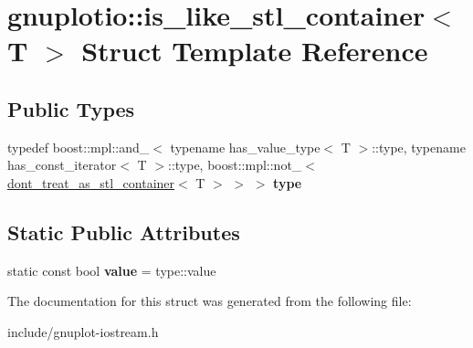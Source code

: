\hypertarget{structgnuplotio_1_1is__like__stl__container}{}\section{gnuplotio\+:\+:is\+\_\+like\+\_\+stl\+\_\+container$<$ T $>$ Struct Template Reference}
\label{structgnuplotio_1_1is__like__stl__container}
\subsection*{Public Types}
\begin{DoxyCompactItemize}
\item 
\mbox{\label{structgnuplotio_1_1is__like__stl__container_a050ecfa55e896a27f86d901334f47c6a}} 
typedef boost\+::mpl\+::and\+\_\+$<$ typename has\+\_\+value\+\_\+type$<$ T $>$\+::type, typename has\+\_\+const\+\_\+iterator$<$ T $>$\+::type, boost\+::mpl\+::not\+\_\+$<$ \hyperlink{structgnuplotio_1_1dont__treat__as__stl__container}{dont\+\_\+treat\+\_\+as\+\_\+stl\+\_\+container}$<$ T $>$ $>$ $>$ {\bfseries type}
\end{DoxyCompactItemize}
\subsection*{Static Public Attributes}
\begin{DoxyCompactItemize}
\item 
\mbox{\label{structgnuplotio_1_1is__like__stl__container_ae4761e6e807deed732e41118c785c8a4}} 
static const bool {\bfseries value} = type\+::value
\end{DoxyCompactItemize}


The documentation for this struct was generated from the following file\+:\begin{DoxyCompactItemize}
\item 
include/gnuplot-\/iostream.\+h\end{DoxyCompactItemize}
